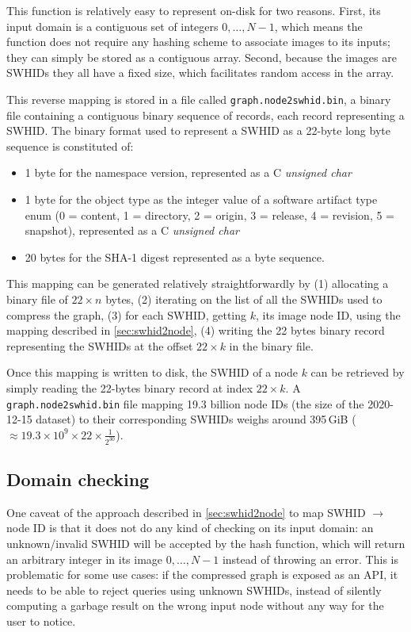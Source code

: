 This function is relatively easy to represent on-disk for two reasons. First,
its input domain is a contiguous set of integers ${0,\ldots,N-1}$, which means
the function does not require any hashing scheme to associate images to its
inputs; they can simply be stored as a contiguous array. Second, because the
images are \glspl{SWHID} they all have a fixed size, which facilitates random
access in the array.

This reverse mapping is stored in a file called \texttt{graph.node2swhid.bin},
a binary file containing a contiguous binary sequence of records, each record
representing a \gls{SWHID}. The binary format used to represent a \gls{SWHID}
as a 22-byte long byte sequence is constituted of:

\begin{itemize}
    \item 1 byte for the namespace version, represented as a C \emph{unsigned
        char}
    \item 1 byte for the object type as the integer value of a software
        artifact type enum (0 = content, 1 = directory, 2 = origin, 3 =
        release, 4 = revision, 5 = snapshot), represented as a C \emph{unsigned
        char}
    \item 20 bytes for the SHA-1 digest represented as a byte sequence.
\end{itemize}

This mapping can be generated relatively straightforwardly by (1) allocating a
binary file of $22 \times n$ bytes, (2) iterating on the list of all the
\glspl{SWHID} used to compress the graph, (3) for each \gls{SWHID}, getting
$k$, its image node ID, using the mapping described in \cref{sec:swhid2node},
(4) writing the 22 bytes binary record representing the \glspl{SWHID} at the
offset $22 \times k$ in the binary file.

Once this mapping is written to disk, the \gls{SWHID} of a node $k$ can be
retrieved by simply reading the 22-bytes binary record at index $22 \times k$.
A \texttt{graph.node2swhid.bin} file mapping 19.3 billion node IDs (the size of
the 2020-12-15 dataset) to their corresponding \glspl{SWHID} weighs
around 395\,GiB ($\approx 19.3 \times 10^9 \times 22 \times \frac{1}{2^{30}}$).

\subsection{Domain checking}

One caveat of the approach described in \cref{sec:swhid2node} to map
\gls{SWHID} $\to$ node ID is that it does not do any kind of checking on its
input domain: an unknown/invalid \gls{SWHID} will be accepted by the hash
function, which will return an arbitrary integer in its image ${0,\ldots,N-1}$
instead of throwing an error. This is problematic for some use cases: if the
compressed graph is exposed as an API, it needs to be able to reject queries
using unknown \glspl{SWHID}, instead of silently computing a garbage result on
the wrong input node without any way for the user to notice.

